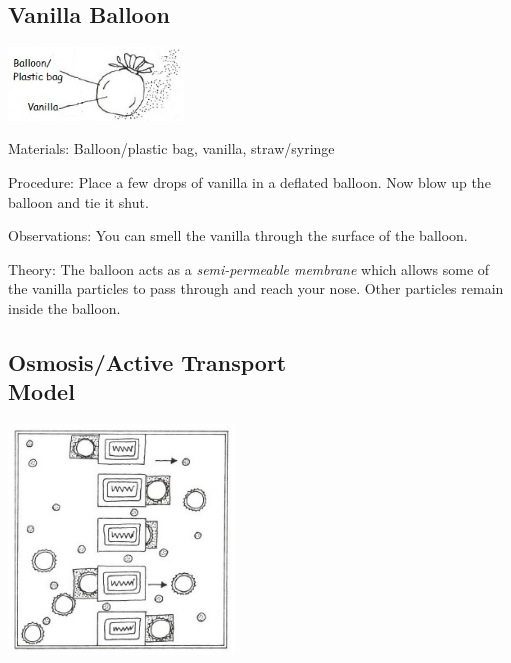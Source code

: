 \begin{multicols}{2}
\columnbreak

\subsection{Vanilla Balloon}

\begin{center}
\includegraphics[width=0.35\textwidth]{./img/vso/osmosis-vanilla.jpg}
\end{center}

\begin{description*}
\item[Materials:]{Balloon/plastic bag, vanilla, straw/syringe}
\item[Procedure:]{Place a few drops of vanilla in a deflated balloon. Now blow up the balloon and tie it shut.}
\item[Observations:]{You can smell the vanilla through the surface of the balloon.}
\item[Theory:]{The balloon acts as a \emph{semi-permeable membrane} which allows some of the vanilla particles to pass through and reach your nose. Other particles remain inside the balloon.}
\end{description*}

\subsection{Osmosis/Active Transport \hfill \\ Model} %

\begin{center}
\includegraphics[width=0.45\textwidth]{./img/vso/active-transport.jpg}
\end{center}


\end{multicols}
